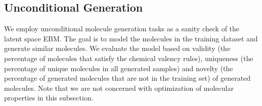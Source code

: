 \documentclass[accepted]{uai2023} %
\begin{document}
\subsection{Unconditional Generation}
\label{sec:a2}
We employ unconditional molecule generation tasks as a sanity check of the latent space EBM. The goal is to model the molecules in the training dataset and generate similar molecules. We evaluate the model based on validity (the percentage of molecules that satisfy the chemical valency rules), uniqueness (the percentage of unique molecules in all generated samples) and novelty (the percentage of generated molecules that are not in the training set) of generated molecules. Note that we are not concerned with optimization of molecular properties in this subsection. 


\end{document}
